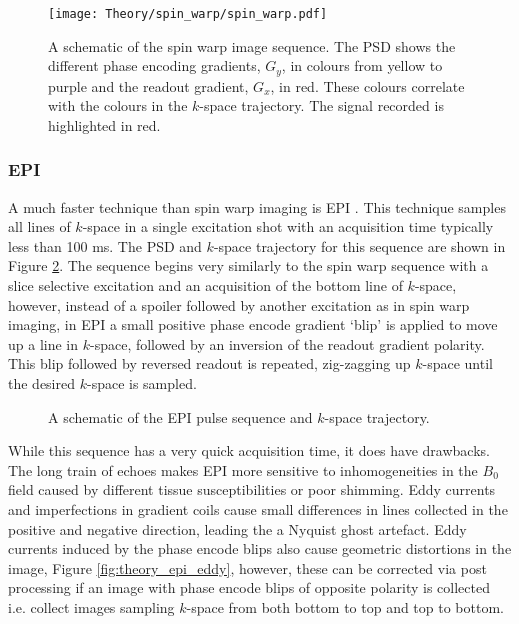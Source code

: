 \begin{figure}[H]
	\centering
	\texttt{[image: Theory/spin\_warp/spin\_warp.pdf]}
	\caption{A schematic of the spin warp image sequence. The \ac*{PSD} shows the different phase encoding gradients, $G_y$, in colours from yellow to purple and the readout gradient, $G_x$, in red. These colours correlate with the colours in the $k$-space trajectory. The signal recorded is highlighted in red.}
	\label{fig:theory_spin_warp}	
\end{figure}

\subsubsection{\ac*{EPI}}
A much faster technique than spin warp imaging is \ac{EPI} \cite{mansfield_nmr_1973}. This technique samples all lines of $k$-space in a single excitation shot with an acquisition time typically less than 100 ms. The \ac{PSD} and $k$-space trajectory for this sequence are shown in Figure \ref{fig:theory_epi}. The sequence begins very similarly to the spin warp sequence with a slice selective excitation and an acquisition of the bottom line of $k$-space, however, instead of a spoiler followed by another excitation as in spin warp imaging, in \ac{EPI} a small positive phase encode gradient `blip' is applied to move up a line in $k$-space, followed by an inversion of the readout gradient polarity. This blip followed by reversed readout is repeated, zig-zagging up $k$-space until the desired $k$-space is sampled.

\begin{figure}[H]
	\centering
	\caption{A schematic of the \ac{EPI} pulse sequence and $k$-space trajectory.}
	\label{fig:theory_epi}	
\end{figure}

While this sequence has a very quick acquisition time, it does have drawbacks. The long train of echoes makes \ac{EPI} more sensitive to inhomogeneities in the $B_0$ field caused by different tissue susceptibilities or poor shimming. Eddy currents and imperfections in gradient coils cause small differences in lines collected in the positive and negative direction, leading the a Nyquist ghost artefact. Eddy currents induced by the phase encode blips also cause geometric distortions in the image, Figure \ref{fig:theory_epi_eddy}, however, these can be corrected via post processing if an image with phase encode blips of opposite polarity is collected i.e. collect images sampling $k$-space from both bottom to top and top to bottom.

